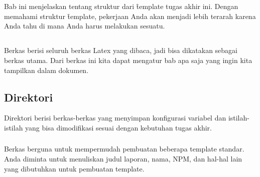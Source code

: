 \chapter{\babEmpat}
\label{bab:4}
Bab ini menjelaskan tentang struktur dari \f{template} tugas akhir ini.
Dengan memahami struktur \f{template}, pekerjaan Anda akan menjadi lebih terarah karena Anda tahu di mana Anda harus melakukan sesuatu.



\section{}
\label{sec:thesis-tex}
Berkas  berisi seluruh berkas Latex yang dibaca, jadi bisa dikatakan sebagai berkas utama.
Dari berkas ini kita dapat mengatur bab apa saja yang ingin kita tampilkan dalam dokumen.


\section{Direktori }
\label{sec:config-dir}
Direktori  berisi berkas-berkas yang menyimpan konfigurasi variabel dan istilah-istilah yang bisa dimodifikasi sesuai dengan kebutuhan tugas akhir.

\subsection{}
\label{sec:settings-tex}
Berkas  berguna untuk mempermudah pembuatan beberapa template standar.
Anda diminta untuk menuliskan judul laporan, nama, NPM, dan hal-hal lain yang dibutuhkan untuk pembuatan template.


